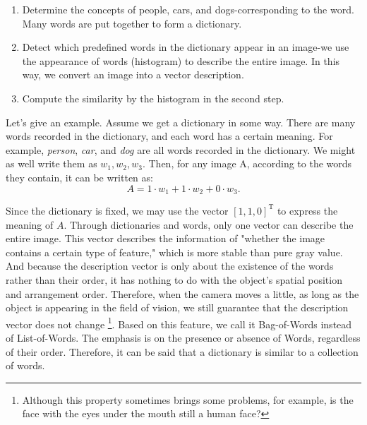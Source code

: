 \begin{enumerate}
	\item Determine the concepts of people, cars, and dogs-corresponding to the word. Many words are put together to form a dictionary.
	\item Detect which predefined words in the dictionary appear in an image-we use the appearance of words (histogram) to describe the entire image. In this way, we convert an image into a vector description.
	\item Compute the similarity by the histogram in the second step.
\end{enumerate}


Let's give an example. Assume we get a dictionary in some way. There are many words recorded in the dictionary, and each word has a certain meaning. For example, \textit{person}, \textit{car}, and \textit{dog} are all words recorded in the dictionary. We might as well write them as $w_1, w_2, w_3$. Then, for any image A, according to the words they contain, it can be written as:
\begin{equation}
	A = 1 \cdot w_1+1\cdot w_2 + 0 \cdot w_3.
\end{equation}

Since the dictionary is fixed, we may use the vector $[1,1,0]^\mathrm{T}$ to express the meaning of $A$. Through dictionaries and words, only one vector can describe the entire image. This vector describes the information of "whether the image contains a certain type of feature," which is more stable than pure gray value. And because the description vector is only about the existence of the words rather than their order, it has nothing to do with the object's spatial position and arrangement order. Therefore, when the camera moves a little, as long as the object is appearing in the field of vision, we still guarantee that the description vector does not change \footnote{Although this property sometimes brings some problems, for example, is the face with the eyes under the mouth still a human face? }. Based on this feature, we call it Bag-of-Words instead of List-of-Words. The emphasis is on the presence or absence of Words, regardless of their order. Therefore, it can be said that a dictionary is similar to a collection of words.


